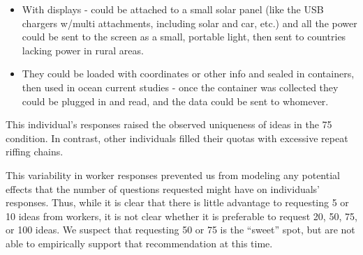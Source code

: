 \begin{itemize}
\item With displays - could be attached to a small solar panel (like the USB chargers w/multi attachments, including solar and car, etc.) and all the power could be sent to the screen as a small, portable light, then sent to countries lacking power in rural areas.
\item They could be loaded with coordinates or other info and sealed in containers, then used in ocean current studies - once the container was collected they could be plugged in and read, and the data could be sent to whomever.
\end{itemize}

This individual's responses raised the observed uniqueness of ideas in the 75 condition. 
In contrast, other individuals filled their quotas with excessive repeat riffing chains. 

This variability in worker responses prevented us from modeling any potential effects that the number of questions requested might have on individuals' responses. Thus, while it is clear that there is little advantage to requesting 5 or 10 ideas from workers, it is not clear whether it is preferable to request 20, 50, 75, or 100 ideas. We suspect that requesting 50 or 75 is the ``sweet'' spot, but are not able to empirically support that recommendation at this time.


